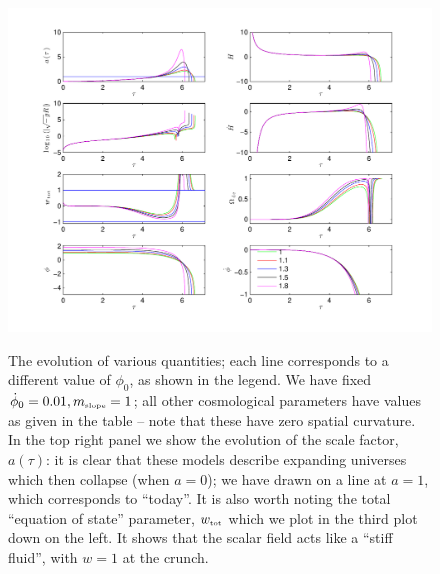 \documentclass[amsmath,amssymb,12pt,eqsecnum]{revtex4}
\begin{document}
\begin{figure}[!t]
      \begin{center}
{\includegraphics[scale=0.8]{images/evPlots.pdf}}
      \end{center}
\caption{The evolution of various quantities; each line corresponds to a different value of $\phi_0$, as shown in the legend. We have fixed $\dot{\phi}_0 = 0.01, {m}_{\scriptscriptstyle{\textrm{slope}}} = 1$; all other cosmological parameters have values as given in the table -- note that these have zero spatial curvature. In the top right panel we show the evolution of the scale factor, $a(\tau)$: it is clear that these models describe expanding universes which then collapse (when $a=0$); we have drawn on a line at $a=1$, which corresponds to ``today''. It is also worth noting the total ``equation of state'' parameter, ${w}_{\scriptscriptstyle{\textrm{tot}}}$ which we plot in the third plot down on the left. It shows that the scalar field acts like a ``stiff fluid'', with $w=1$ at the crunch.} \label{fig:evplots1}
\end{figure}
\end{document}
